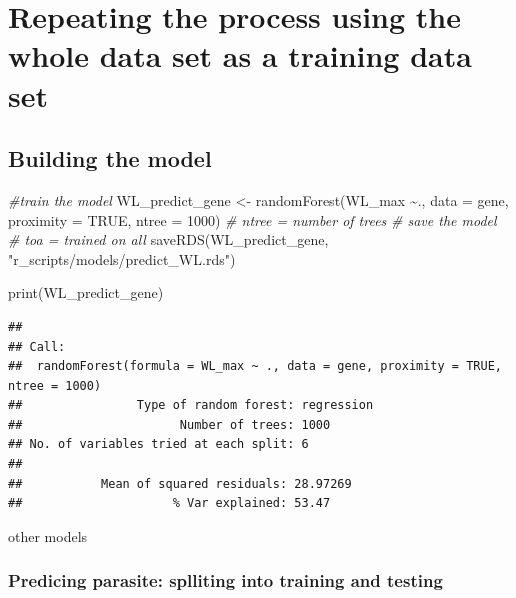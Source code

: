 \documentclass[
]{article}
\newenvironment{Shaded}{\begin{snugshade}}{\end{snugshade}}
\newcommand{\AttributeTok}[1]{\textcolor[rgb]{0.77,0.63,0.00}{#1}}
\newcommand{\CommentTok}[1]{\textcolor[rgb]{0.56,0.35,0.01}{\textit{#1}}}
\newcommand{\ConstantTok}[1]{\textcolor[rgb]{0.00,0.00,0.00}{#1}}
\newcommand{\DecValTok}[1]{\textcolor[rgb]{0.00,0.00,0.81}{#1}}
\newcommand{\FunctionTok}[1]{\textcolor[rgb]{0.00,0.00,0.00}{#1}}
\newcommand{\NormalTok}[1]{#1}
\newcommand{\OtherTok}[1]{\textcolor[rgb]{0.56,0.35,0.01}{#1}}
\newcommand{\SpecialCharTok}[1]{\textcolor[rgb]{0.00,0.00,0.00}{#1}}
\newcommand{\StringTok}[1]{\textcolor[rgb]{0.31,0.60,0.02}{#1}}
\begin{document}
\hypertarget{repeating-the-process-using-the-whole-data-set-as-a-training-data-set}{%
\section{Repeating the process using the whole data set as a training
data
set}\label{repeating-the-process-using-the-whole-data-set-as-a-training-data-set}}

\hypertarget{building-the-model-1}{%
\subsection{Building the model}\label{building-the-model-1}}

\begin{Shaded}
\begin{Highlighting}[]
\CommentTok{\#train the model}
\NormalTok{WL\_predict\_gene }\OtherTok{\textless{}{-}} \FunctionTok{randomForest}\NormalTok{(WL\_max }\SpecialCharTok{\textasciitilde{}}\NormalTok{., }\AttributeTok{data =}\NormalTok{ gene, }
                                    \AttributeTok{proximity =} \ConstantTok{TRUE}\NormalTok{, }\AttributeTok{ntree =} \DecValTok{1000}\NormalTok{) }
\CommentTok{\# ntree = number of trees     }
\CommentTok{\# save the model }
\CommentTok{\# toa = trained on all}
\FunctionTok{saveRDS}\NormalTok{(WL\_predict\_gene, }\StringTok{"r\_scripts/models/predict\_WL.rds"}\NormalTok{)}

\FunctionTok{print}\NormalTok{(WL\_predict\_gene)}
\end{Highlighting}
\end{Shaded}

\begin{verbatim}
## 
## Call:
##  randomForest(formula = WL_max ~ ., data = gene, proximity = TRUE,      ntree = 1000) 
##                Type of random forest: regression
##                      Number of trees: 1000
## No. of variables tried at each split: 6
## 
##           Mean of squared residuals: 28.97269
##                     % Var explained: 53.47
\end{verbatim}

other models

\hypertarget{predicing-parasite-splliting-into-training-and-testing}{%
\subsubsection{Predicing parasite: splliting into training and
testing}\label{predicing-parasite-splliting-into-training-and-testing}}
\end{document}
